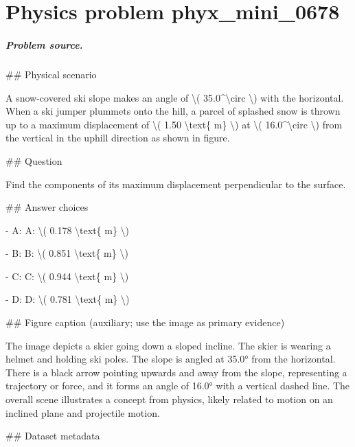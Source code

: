 
\chapter{Physics problem phyx\_mini\_0678}
\label{ch:PhyXMiniProblems_problem_phyx_mini_0678}

\paragraph{Problem source.}
\#\# Physical scenario

A snow-covered ski slope makes an angle of \textbackslash{}( 35.0\textasciicircum{}\textbackslash{}circ \textbackslash{}) with the horizontal. When a ski jumper plummets onto the hill, a parcel of splashed snow is thrown up to a maximum displacement of \textbackslash{}( 1.50 \textbackslash{}text\{ m\} \textbackslash{}) at \textbackslash{}( 16.0\textasciicircum{}\textbackslash{}circ \textbackslash{}) from the vertical in the uphill direction as shown in figure.

\#\# Question

Find the components of its maximum displacement perpendicular to the surface.

\#\# Answer choices

- A: A: \textbackslash{}( 0.178 \textbackslash{}text\{ m\} \textbackslash{})

- B: B: \textbackslash{}( 0.851 \textbackslash{}text\{ m\} \textbackslash{})

- C: C: \textbackslash{}( 0.944 \textbackslash{}text\{ m\} \textbackslash{})

- D: D: \textbackslash{}( 0.781 \textbackslash{}text\{ m\} \textbackslash{})

\#\# Figure caption (auxiliary; use the image as primary evidence)

The image depicts a skier going down a sloped incline. The skier is wearing a helmet and holding ski poles. The slope is angled at 35.0° from the horizontal. There is a black arrow pointing upwards and away from the slope, representing a trajectory or force, and it forms an angle of 16.0° with a vertical dashed line. The overall scene illustrates a concept from physics, likely related to motion on an inclined plane and projectile motion.

\#\# Dataset metadata


